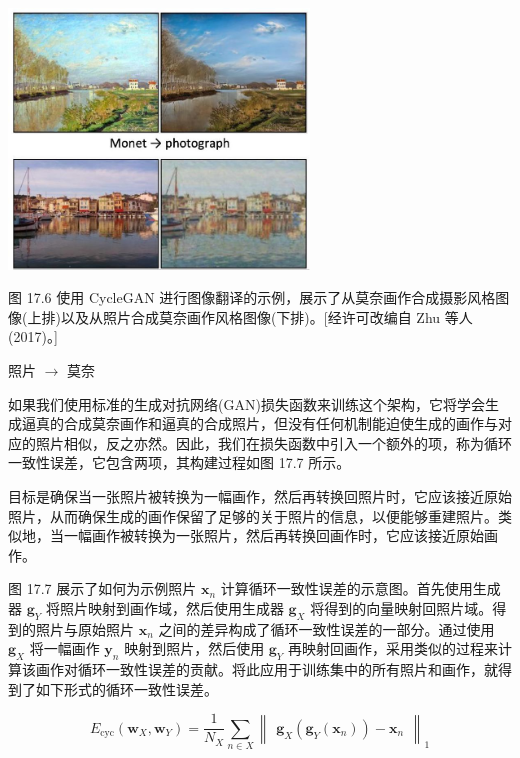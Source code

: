 \documentclass[10pt]{report}
\begin{document}
\begin{center}
\includegraphics[max width=0.6\textwidth]{images/0194e279-9b28-703a-88f4-c3ac21e2010d_560_804_348_741_641_0.jpg}
\end{center}
\hspace*{3em} 

图 17.6 使用 CycleGAN 进行图像翻译的示例，展示了从莫奈画作合成摄影风格图像(上排)以及从照片合成莫奈画作风格图像(下排)。[经许可改编自 Zhu 等人(2017)。]

照片 \(\rightarrow\) 莫奈

如果我们使用标准的生成对抗网络(GAN)损失函数来训练这个架构，它将学会生成逼真的合成莫奈画作和逼真的合成照片，但没有任何机制能迫使生成的画作与对应的照片相似，反之亦然。因此，我们在损失函数中引入一个额外的项，称为循环一致性误差，它包含两项，其构建过程如图 17.7 所示。

目标是确保当一张照片被转换为一幅画作，然后再转换回照片时，它应该接近原始照片，从而确保生成的画作保留了足够的关于照片的信息，以便能够重建照片。类似地，当一幅画作被转换为一张照片，然后再转换回画作时，它应该接近原始画作。

图 17.7 展示了如何为示例照片 \({\mathbf{x}}_{n}\) 计算循环一致性误差的示意图。首先使用生成器 \({\mathbf{g}}_{Y}\) 将照片映射到画作域，然后使用生成器 \({\mathbf{g}}_{X}\) 将得到的向量映射回照片域。得到的照片与原始照片 \({\mathbf{x}}_{n}\) 之间的差异构成了循环一致性误差的一部分。通过使用 \({\mathbf{g}}_{X}\) 将一幅画作 \({\mathbf{y}}_{n}\) 映射到照片，然后使用 \({\mathbf{g}}_{Y}\) 再映射回画作，采用类似的过程来计算该画作对循环一致性误差的贡献。将此应用于训练集中的所有照片和画作，就得到了如下形式的循环一致性误差。

\[
{E}_{\mathrm{{cyc}}}\left( {{\mathbf{w}}_{X},{\mathbf{w}}_{Y}}\right)  = \frac{1}{{N}_{X}}\mathop{\sum }\limits_{{n \in  X}}{\begin{Vmatrix}{\mathbf{g}}_{X}\left( {\mathbf{g}}_{Y}\left( {\mathbf{x}}_{n}\right) \right)  - {\mathbf{x}}_{n}\end{Vmatrix}}_{1}
\]
\end{document}

